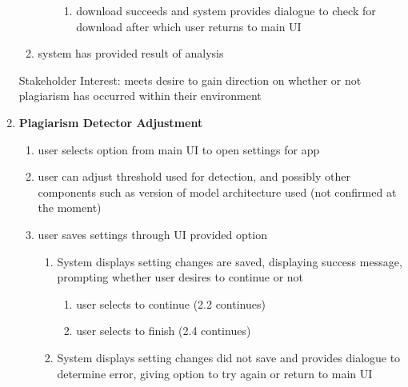 \documentclass[12pt]{article}
\begin{document}
\begin{enumerate}
\begin{enumerate}
\begin{enumerate}
\begin{enumerate}
                \item download succeeds and system provides dialogue to check for download after which user returns to main UI

            \end{enumerate}
        \end{enumerate}
        
        \item system has provided result of analysis
        
    \end{enumerate}

    Stakeholder Interest: meets desire to gain direction on whether or not plagiarism has occurred within their environment

    \newpage

    \item \textbf{Plagiarism Detector Adjustment}

    \begin{enumerate}
        \item user selects option from main UI to open settings for app

        \item user can adjust threshold used for detection, and possibly other components such as version of model architecture used (not confirmed at the moment)

        \item user saves settings through UI provided option

        \begin{enumerate}

            \item System displays setting changes are saved, displaying success message, prompting whether user desires to continue or not

            \begin{enumerate}

                \item user selects to continue (2.2 continues)

                \item user selects to finish (2.4 continues)

            \end{enumerate}

            \item System displays setting changes did not save and provides dialogue to determine error, giving option to try again or return to main UI 


\end{enumerate}
\end{enumerate}
\end{enumerate}
\end{document}
